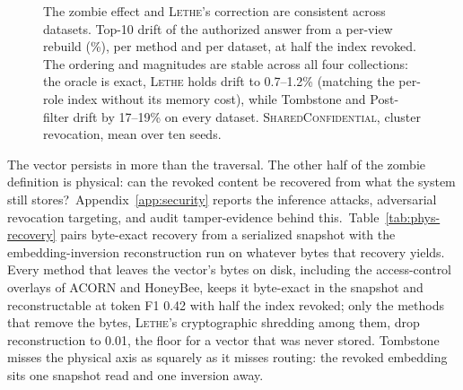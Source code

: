 \documentclass[sigconf, nonacm, review]{acmart}
\newif\ifextended\extendedtrue %
\begin{document}
\begin{figure}[t]
{%
}
\caption{The zombie effect and \textsc{Lethe}'s correction are consistent across datasets. Top-10 drift of the authorized answer from a per-view rebuild (\%), per method and per dataset, at half the index revoked. The ordering and magnitudes are stable across all four collections: the oracle is exact, \textsc{Lethe} holds drift to 0.7--1.2\% (matching the per-role index without its memory cost), while Tombstone and Post-filter drift by 17--19\% on every dataset. \textsc{SharedConfidential}, cluster revocation, mean over ten seeds.}
\label{fig:perdataset}
\end{figure}

The vector persists in more than the traversal. The other half of the zombie
definition is physical: can the revoked content be recovered from what the
system still stores?\ifextended\ Appendix~\ref{app:security} reports the inference attacks, adversarial revocation targeting, and audit tamper-evidence behind this.\fi\ Table~\ref{tab:phys-recovery} pairs byte-exact recovery from a
serialized snapshot with the embedding-inversion reconstruction run on
whatever bytes that recovery yields. Every method that leaves the vector's bytes on disk, including the access-control overlays of ACORN and HoneyBee,
keeps it byte-exact in the snapshot and reconstructable at token
F1 0.42 with half the index revoked; only the methods that remove the bytes, \textsc{Lethe}'s cryptographic shredding among them, drop
reconstruction to 0.01, the floor for a vector that was never stored. Tombstone misses the physical axis as squarely as it
misses routing: the revoked embedding sits one snapshot read and one inversion
away.
\end{document}
